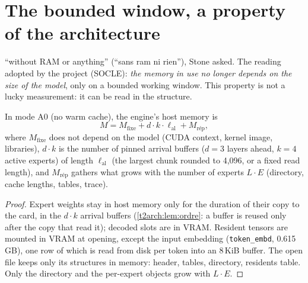 \section{The bounded window, a property of the architecture}\label{t2arch:sec:fenetre}

``without RAM or anything'' (``sans ram ni rien''), Stone asked. The reading adopted by the project (SOCLE): \emph{the memory in use no longer depends on the size of the model}, only on a bounded working window. This property is not a lucky measurement: it can be read in the structure.

\begin{proposition}\label{t2arch:prop:fenetre}
In mode A0 (no warm cache), the engine's host memory is
\[
M = M_{\mathrm{fixe}} + d \cdot k \cdot \ell_{\mathrm{al}} + M_{\mathrm{rép}},
\]
where $M_{\mathrm{fixe}}$ does not depend on the model (CUDA context, kernel image, libraries), $d \cdot k$ is the number of pinned arrival buffers ($d = 3$ layers ahead, $k = 4$ active experts) of length $\ell_{\mathrm{al}}$ (the largest chunk rounded to 4{,}096, or a fixed read length), and $M_{\mathrm{rép}}$ gathers what grows with the number of experts $L \cdot E$ (directory, cache lengths, tables, trace).
\end{proposition}

\begin{proof}
Expert weights stay in host memory only for the duration of their copy to the card, in the $d \cdot k$ arrival buffers (\cref{t2arch:lem:ordre}: a buffer is reused only after the copy that read it); decoded slots are in VRAM. Resident tensors are mounted in VRAM at opening, except the input embedding (\texttt{token\_embd}, 0.615\,GB), one row of which is read from disk per token into an 8\,KiB buffer. The open file keeps only its structures in memory: header, tables, directory, residents table. Only the directory and the per-expert objects grow with $L \cdot E$.
\end{proof}


